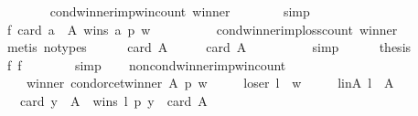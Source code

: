\begin{isabellebody}
\ \ \ \ \ \ \isamarkupfalse%
\ cond{\isacharunderscore}{\kern0pt}winner{\isacharunderscore}{\kern0pt}imp{\isacharunderscore}{\kern0pt}win{\isacharunderscore}{\kern0pt}count\ winner\isanewline
\ \ \ \ \ \ \isamarkupfalse%
\ simp\isanewline
\ \ \ \ \isamarkupfalse%
\ f{}{\isacharcolon}{\kern0pt}\ {\isachardoublequoteopen}card\ {\isacharbraceleft}{\kern0pt}a\ {\isasymin}\ A{\isachardot}{\kern0pt}\ wins\ a\ p\ w{\isacharbraceright}{\kern0pt}\ {\isacharequal}{\kern0pt}\ {}{\isachardoublequoteclose}\isanewline
\ \ \ \ \ \ \isamarkupfalse%
\ cond{\isacharunderscore}{\kern0pt}winner{\isacharunderscore}{\kern0pt}imp{\isacharunderscore}{\kern0pt}loss{\isacharunderscore}{\kern0pt}count\ winner\isanewline
\ \ \ \ \ \ \isamarkupfalse%
\ {\isacharparenleft}{\kern0pt}metis\ {\isacharparenleft}{\kern0pt}no{\isacharunderscore}{\kern0pt}types{\isacharparenright}{\kern0pt}{\isacharparenright}{\kern0pt}\isanewline
\ \ \ \ \isamarkupfalse%
\ {\isachardoublequoteopen}card\ A\ {\isacharminus}{\kern0pt}\ {}\ {\isacharminus}{\kern0pt}\ {}\ {\isacharequal}{\kern0pt}\ card\ A\ {\isacharminus}{\kern0pt}\ {}{\isachardoublequoteclose}\isanewline
\ \ \ \ \ \ \isamarkupfalse%
\ simp\isanewline
\ \ \ \ \isamarkupfalse%
\ {\isacharquery}{\kern0pt}thesis\isanewline
\ \ \ \ \ \ \isamarkupfalse%
\ f{}\ f{}\isanewline
\ \ \ \ \ \ \isamarkupfalse%
\ simp\isanewline
\ \ \isamarkupfalse%
\isanewline
{}\isamarkupfalse%
%
\endisatagproof
{\isafoldproof}%
%
\isadelimproof
\isanewline
%
\endisadelimproof
\isanewline
\isanewline
{}\isamarkupfalse%
\ non{\isacharunderscore}{\kern0pt}cond{\isacharunderscore}{\kern0pt}winner{\isacharunderscore}{\kern0pt}imp{\isacharunderscore}{\kern0pt}win{\isacharunderscore}{\kern0pt}count{\isacharcolon}{\kern0pt}\isanewline
\ \ \isanewline
\ \ \ \ winner{\isacharcolon}{\kern0pt}\ {\isachardoublequoteopen}condorcet{\isacharunderscore}{\kern0pt}winner\ A\ p\ w{\isachardoublequoteclose}\ \isanewline
\ \ \ \ loser{\isacharcolon}{\kern0pt}\ {\isachardoublequoteopen}l\ {\isasymnoteq}\ w{\isachardoublequoteclose}\ \isanewline
\ \ \ \ l{\isacharunderscore}{\kern0pt}in{\isacharunderscore}{\kern0pt}A{\isacharcolon}{\kern0pt}\ {\isachardoublequoteopen}l\ {\isasymin}\ A{\isachardoublequoteclose}\isanewline
\ \ \ {\isachardoublequoteopen}card\ {\isacharbraceleft}{\kern0pt}y\ {\isasymin}\ A\ {\isachardot}{\kern0pt}\ wins\ l\ p\ y{\isacharbraceright}{\kern0pt}\ {\isacharless}{\kern0pt}{\isacharequal}{\kern0pt}\ card\ A\ {\isacharminus}{\kern0pt}\ {}{\isachardoublequoteclose}\isanewline

\end{isabellebody}
